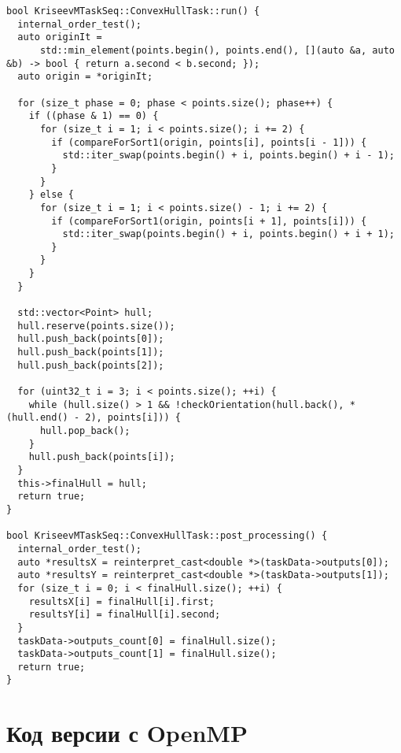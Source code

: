 \documentclass[a4paper,12pt]{article}
\begin{document}
\begin{lstlisting}
bool KriseevMTaskSeq::ConvexHullTask::run() {
  internal_order_test();
  auto originIt =
      std::min_element(points.begin(), points.end(), [](auto &a, auto &b) -> bool { return a.second < b.second; });
  auto origin = *originIt;

  for (size_t phase = 0; phase < points.size(); phase++) {
    if ((phase & 1) == 0) {
      for (size_t i = 1; i < points.size(); i += 2) {
        if (compareForSort1(origin, points[i], points[i - 1])) {
          std::iter_swap(points.begin() + i, points.begin() + i - 1);
        }
      }
    } else {
      for (size_t i = 1; i < points.size() - 1; i += 2) {
        if (compareForSort1(origin, points[i + 1], points[i])) {
          std::iter_swap(points.begin() + i, points.begin() + i + 1);
        }
      }
    }
  }

  std::vector<Point> hull;
  hull.reserve(points.size());
  hull.push_back(points[0]);
  hull.push_back(points[1]);
  hull.push_back(points[2]);

  for (uint32_t i = 3; i < points.size(); ++i) {
    while (hull.size() > 1 && !checkOrientation(hull.back(), *(hull.end() - 2), points[i])) {
      hull.pop_back();
    }
    hull.push_back(points[i]);
  }
  this->finalHull = hull;
  return true;
}

bool KriseevMTaskSeq::ConvexHullTask::post_processing() {
  internal_order_test();
  auto *resultsX = reinterpret_cast<double *>(taskData->outputs[0]);
  auto *resultsY = reinterpret_cast<double *>(taskData->outputs[1]);
  for (size_t i = 0; i < finalHull.size(); ++i) {
    resultsX[i] = finalHull[i].first;
    resultsY[i] = finalHull[i].second;
  }
  taskData->outputs_count[0] = finalHull.size();
  taskData->outputs_count[1] = finalHull.size();
  return true;
}
\end{lstlisting}

\section{Код версии с OpenMP}
\end{document}
